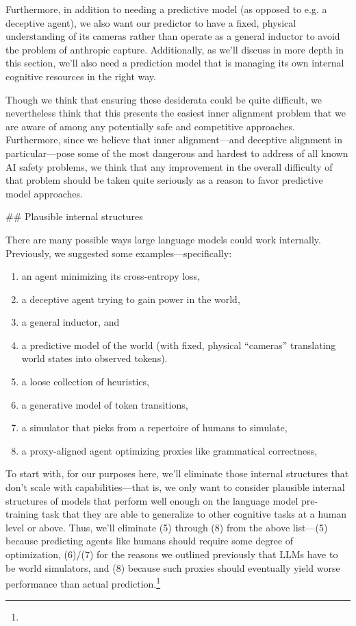 {Furthermore, in addition to needing a predictive model (as opposed to e.g. a deceptive agent), we also want our predictor to have a fixed, physical understanding of its cameras rather than operate as a general inductor to avoid the problem of anthropic capture\cite{TODO: cite TODO}. Additionally, as we'll discuss in more depth in this section\cite{TODO: cite TODO}, we'll also need a prediction model that is managing its own internal cognitive resources in the right way.

Though we think that ensuring these desiderata could be quite difficult, we nevertheless think that this presents the easiest inner alignment problem that we are aware of among any potentially safe and competitive approaches\cite{TODO: cite https://www.alignmentforum.org/posts/fRsjBseRuvRhMPPE5/an-overview-of-11-proposals-for-building-safe-advanced-ai}. Furthermore, since we believe that inner alignment---and deceptive alignment in particular---pose some of the most dangerous and hardest to address of all known AI safety problems\cite{TODO: cite https://www.alignmentforum.org/s/r9tYkB2a8Fp4DN8yB}, we think that any improvement in the overall difficulty of that problem should be taken quite seriously as a reason to favor predictive model approaches.


## Plausible internal structures

There are many possible ways large language models could work internally. Previously, we suggested some examples---specifically:



\begin{enumerate}
\item an agent minimizing its cross-entropy loss,
\item a deceptive agent trying to gain power in the world,
\item a general inductor, and
\item a predictive model of the world (with fixed, physical ``cameras'' translating world states into observed tokens).
\item a loose collection of heuristics,
\item a generative model of token transitions,
\item a simulator that picks from a repertoire of humans to simulate,
\item a proxy-aligned agent optimizing proxies like grammatical correctness,
\end{enumerate}

To start with, for our purposes here, we'll eliminate those internal structures that don't scale with capabilities---that is, we only want to consider plausible internal structures of models that perform well enough on the language model pre-training task that they are able to generalize to other cognitive tasks at a human level or above. Thus, we'll eliminate (5) through (8)  from the above list---(5) because predicting agents like humans should require some degree of optimization, (6)/(7) for the reasons we outlined previously\cite{TODO: cite TODO} that LLMs have to be world simulators, and (8) because such proxies should eventually yield worse performance than actual prediction.\footnote{}

}
